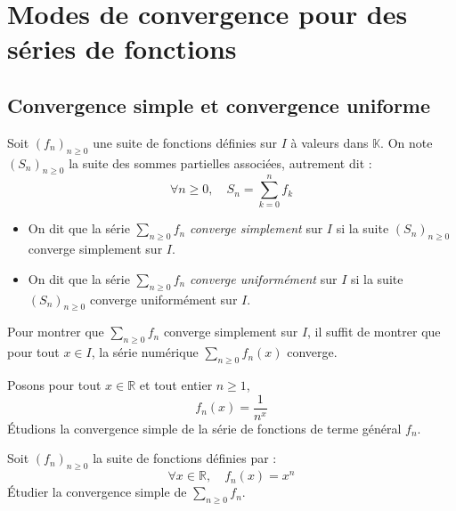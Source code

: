 \documentclass[a4paper,10pt]{report}
\begin{document}
\section{Modes de convergence pour des séries de fonctions}
\subsection{Convergence simple et convergence uniforme}
\begin{Definition}{} Soit $(f_n)_{n \geq 0}$ une suite de fonctions définies sur $I$ à valeurs dans $\mathbb{K}$. On note $(S_n)_{n \geq 0}$ la suite des sommes partielles associées, autrement dit :
$$ \forall n \geq 0, \quad S_n = \sum_{k=0}^n f_k $$

\begin{itemize}
\item On dit que la série $\sum_{n \geq 0} f_n$ \emph{converge simplement} sur $I$ si la suite $(S_n)_{n \geq 0}$ converge simplement sur $I$.
\item On dit que la série $\sum_{n \geq 0} f_n$ \emph{converge uniformément} sur $I$ si la suite $(S_n)_{n \geq 0}$ converge uniformément sur $I$.
\end{itemize}
\end{Definition}

\begin{metho} Pour montrer que $\sum_{n \geq 0} f_n$ converge simplement sur $I$, il suffit de montrer que pour tout $x \in I$, la série numérique $\sum_{n \geq 0} f_n(x)$ converge.
\end{metho}

\begin{Exemple} Posons pour tout $x \in \mathbb{R}$ et tout entier $n \geq 1$,
$$ f_n(x) = \frac{1}{n^x}$$
Étudions la convergence simple de la série de fonctions de terme général $f_n$.

\vspace{5cm}
%
\end{Exemple}

\begin{ApplicationDirecte} Soit $(f_n)_{n \geq 0}$ la suite de fonctions définies par :
$$ \forall x \in \mathbb{R}, \quad f_n(x) = x^n$$
Étudier la convergence simple de $\sum_{n \geq 0} f_n$.
\end{ApplicationDirecte}
\end{document}

